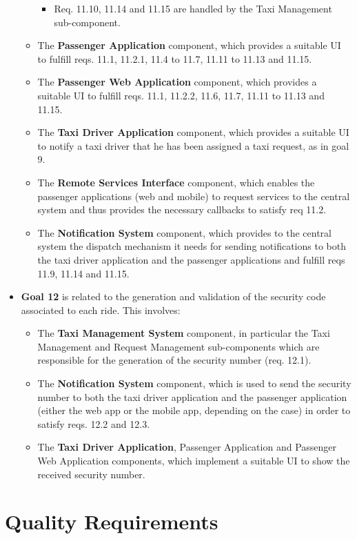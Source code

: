 \begin{itemize}
\begin{itemize}
\begin{itemize}
		\item Req. 11.10, 11.14 and 11.15 are handled by the Taxi Management sub-component.
		\end{itemize}	
		\item The \textbf{Passenger Application} component, which provides a suitable UI to fulfill reqs. 11.1, 11.2.1, 11.4 to 11.7, 11.11 to 11.13 and 11.15.
		\item The \textbf{Passenger Web Application} component, which provides a suitable UI to fulfill reqs. 11.1, 11.2.2, 11.6, 11.7, 11.11 to 11.13 and 11.15.
		\item The \textbf{Taxi Driver Application} component, which provides a suitable UI to notify a taxi driver that he has been assigned a taxi request, as in goal 9.
		\item The \textbf{Remote Services Interface} component, which enables the passenger applications (web and mobile) to request services to the central system and thus provides the necessary callbacks to satisfy req 11.2.
		\item The \textbf{Notification System} component, which provides to the central system the dispatch mechanism it needs for sending notifications to both the taxi driver application and the passenger applications and fulfill reqs 11.9, 11.14 and 11.15.
		\end{itemize}
	\item \textbf{Goal 12} is related to the generation and validation of the security code associated to each ride. This involves:
	\begin{itemize}
	\item The \textbf{Taxi Management System} component, in particular the Taxi Management and Request Management sub-components which are responsible for the generation of the security number (req. 12.1).
	\item The \textbf{Notification System} component, which is used to send the security number to both the taxi driver application and the passenger application (either the web app or the mobile app, depending on the case) in order to satisfy reqs. 12.2 and 12.3.
	\item The \textbf{Taxi Driver Application}, {Passenger Application} and {Passenger Web Application} components, which implement a suitable UI to show the received security number.
	\end{itemize}
	\end{itemize}

\section{Quality Requirements}


